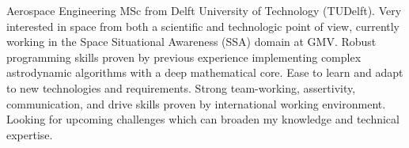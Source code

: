 \documentclass[letter,10pt]{article}
\begin{document}
\justifying

Aerospace Engineering MSc from Delft University of Technology (TUDelft). Very interested in space from both a scientific and technologic point of view, currently working in the Space Situational Awareness (SSA) domain at GMV. Robust programming skills proven by previous experience implementing complex astrodynamic algorithms with a deep mathematical core. Ease to learn and adapt to new technologies and requirements. Strong team-working, assertivity, communication, and drive skills proven by international working environment. Looking for upcoming challenges which can broaden my knowledge and technical expertise.
\end{document}
